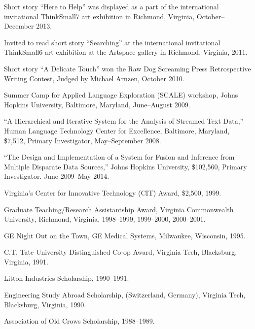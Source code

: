 \documentclass[11pt,article,oneside]{memoir}
\begin{document}
\ind Short story “Here to Help” was displayed as a part of the international invitational ThinkSmall7 art exhibition in Richmond, Virginia, October--December 2013.

\ind Invited to read short story “Searching” at the international invitational ThinkSmall6 art exhibition at the Artspace gallery in Richmond, Virginia, 2011.

\ind Short story “A Delicate Touch” won the Raw Dog Screaming Press Retrospective Writing Contest, Judged by Michael Arnzen, October 2010.

\ind Summer Camp for Applied Language Exploration (SCALE) workshop, Johns Hopkins University, Baltimore, Maryland, June--August 2009.

\ind “A Hierarchical and Iterative System for the Analysis of Streamed Text Data,” Human Language Technology Center for Excellence, Baltimore, Maryland, \$7,512, Primary Investigator, May--September 2008.

\ind “The Design and Implementation of a System for Fusion and Inference from Multiple Disparate Data Sources,” Johns Hopkins University, \$102,560, Primary Investigator.  June 2009--May 2014.

\ind Virginia’s Center for Innovative Technology (CIT) Award, \$2,500, 1999.

\ind Graduate Teaching/Research Assistantship Award, Virginia Commonwealth University, Richmond, Virginia, 1998--1999, 1999--2000, 2000--2001.

\ind GE Night Out on the Town, GE Medical Systems, Milwaukee, Wisconsin, 1995.

\ind C.T. Tate University Distinguished Co-op Award, Virginia Tech, Blacksburg, Virginia, 1991.

\ind Litton Industries Scholarship, 1990--1991.

\ind Engineering Study Abroad Scholarship, (Switzerland, Germany), Virginia Tech, Blacksburg, Virginia, 1990.

\ind Association of Old Crows Scholarship, 1988--1989.






\end{document}
